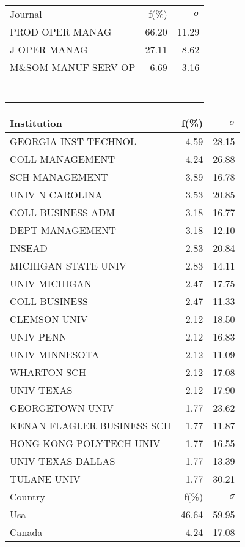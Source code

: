 \documentclass[a4paper,11pt]{report}
\begin{document}
\begin{landscape}
\begin{table}[!ht]
{\begin{tabular}{|l r  r|}
 &  & \\
\hline
\hline
Journal & f(\%) & $\sigma$\\
\hline
PROD OPER MANAG & 66.20 & 11.29\\
J OPER MANAG & 27.11 & -8.62\\
M\&SOM-MANUF SERV OP & 6.69 & -3.16\\
 &  & \\
 &  & \\
 &  & \\
 &  & \\
 &  & \\
 &  & \\
 &  & \\
\hline
\end{tabular}
}
{\scriptsize\begin{tabular}{|l r r|}
\hline
Institution & f(\%) & $\sigma$\\
\hline
GEORGIA INST TECHNOL & 4.59 & 28.15\\
COLL MANAGEMENT & 4.24 & 26.88\\
SCH MANAGEMENT & 3.89 & 16.78\\
UNIV N CAROLINA & 3.53 & 20.85\\
COLL BUSINESS ADM & 3.18 & 16.77\\
DEPT MANAGEMENT & 3.18 & 12.10\\
INSEAD & 2.83 & 20.84\\
MICHIGAN STATE UNIV & 2.83 & 14.11\\
UNIV MICHIGAN & 2.47 & 17.75\\
COLL BUSINESS & 2.47 & 11.33\\
CLEMSON UNIV & 2.12 & 18.50\\
UNIV PENN & 2.12 & 16.83\\
UNIV MINNESOTA & 2.12 & 11.09\\
WHARTON SCH & 2.12 & 17.08\\
UNIV TEXAS & 2.12 & 17.90\\
GEORGETOWN UNIV & 1.77 & 23.62\\
KENAN FLAGLER BUSINESS SCH & 1.77 & 11.87\\
HONG KONG POLYTECH UNIV & 1.77 & 16.55\\
UNIV TEXAS DALLAS & 1.77 & 13.39\\
TULANE UNIV & 1.77 & 30.21\\
\hline
\hline
Country & f(\%) & $\sigma$\\
\hline
Usa & 46.64 & 59.95\\
Canada & 4.24 & 17.08\\

\end{tabular}}
\end{table}
\end{landscape}
\end{document}
